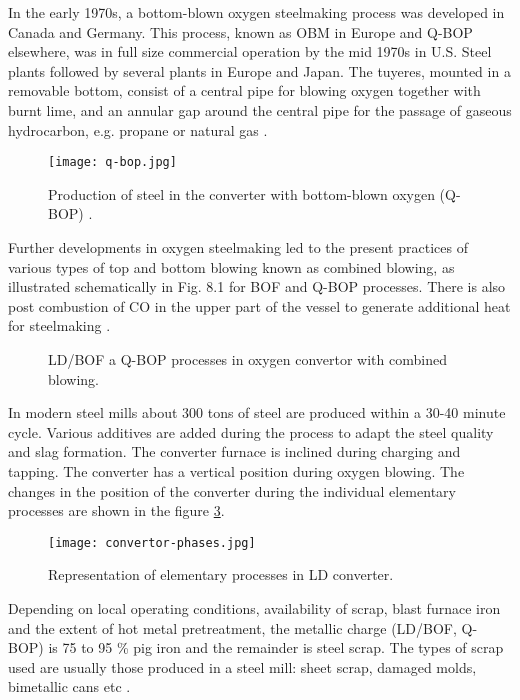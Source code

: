 In the early 1970s, a bottom-blown oxygen steelmaking process was developed in Canada and Germany. This process, known as OBM in Europe and Q-BOP elsewhere, was in full size commercial operation by the mid 1970s in U.S. Steel plants followed by several plants in Europe and Japan. The tuyeres, mounted in a removable bottom, consist of a central pipe for blowing oxygen together with burnt lime, and an annular gap around the central pipe for the passage of gaseous hydrocarbon, e.g. propane or natural gas \citep{Turkdogan1996}.

\begin{figure}[h!]
	\centering
	\texttt{[image: q-bop.jpg]}
	\caption{Production of steel in the converter with bottom-blown oxygen (Q-BOP) \citep{Turkdogan1996}.}
	\label{o:2}
\end{figure}

Further developments in oxygen steelmaking led to the present practices of various types of top and bottom blowing known as combined blowing, as illustrated schematically in Fig. 8.1 for BOF and Q-BOP processes. There is also post combustion of CO in the upper part of the vessel to generate additional heat for steelmaking \citep{Turkdogan1996}.

\begin{figure}[h!tbp]
	\centering
	\hfill
	\caption{LD/BOF a Q-BOP processes in oxygen convertor with combined blowing.}
	\label{o:3}
\end{figure}

In modern steel mills about 300 tons of steel are produced within a 30-40 minute cycle. Various additives are added during the process to adapt the steel quality and slag formation. The converter furnace is inclined during charging and tapping. The converter has a vertical position during oxygen blowing. The changes in the position of the converter during the individual elementary processes are shown in the figure \ref{o:4}.

\begin{figure}[h!]
	\centering
	\texttt{[image: convertor-phases.jpg]}
	\caption{Representation of elementary processes in LD converter.}
	\label{o:4}
\end{figure}

Depending on local operating conditions, availability of scrap, blast furnace iron and the extent of hot metal pretreatment, the metallic charge (LD/BOF, Q-BOP) is 75 to 95 \% pig iron and the remainder is steel scrap. The types of scrap used are usually those produced in a steel mill: sheet scrap, damaged molds, bimetallic cans etc \cite{Turkdogan1996}.

